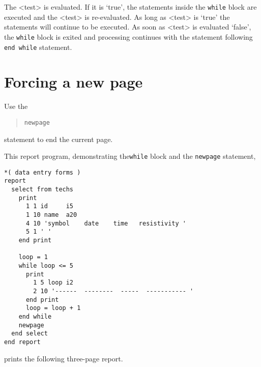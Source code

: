\documentclass[11pt,a4paper]{report}
\begin{document}
The <test> is evaluated.
If it is `true',
the statements inside the \verb!while! block are executed and the <test>
is re-evaluated. As long as <test> is `true' the statements will
continue to be executed.  As soon as <test> is evaluated `false',
the \verb!while! block is exited and processing continues
with the statement following \verb!end while! statement.
 
\section{Forcing a new page}
%
Use the
\begin{verse}
  \verb!newpage!
\end{verse}
statement to end the current page.
 
\demobreak
This report program, demonstrating the\verb!while! block
and the \verb!newpage! statement,
\label{while-inp}
\begin{verbatim}
*( data entry forms )
report
  select from techs
    print
      1 1 id     i5
      1 10 name  a20
      4 10 'symbol    date    time   resistivity '
      5 1 ' '
    end print
 
    loop = 1
    while loop <= 5
      print
        1 5 loop i2
        2 10 '------  --------  -----  ----------- '
      end print
      loop = loop + 1
    end while
    newpage
  end select
end report
\end{verbatim}
prints the following three-page report.
 
\label{while-rpt}
\end{document}
